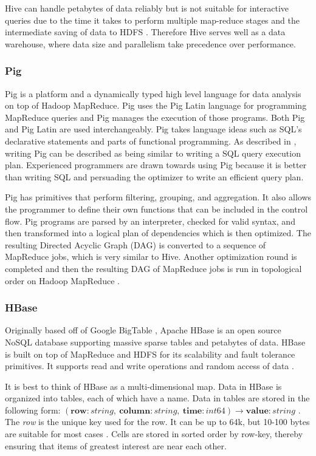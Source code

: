 \documentclass[12pt]{article}
\begin{document}
Hive can handle petabytes of data reliably but is not suitable for interactive queries due to the time it takes to perform multiple map-reduce stages and the intermediate saving of data to HDFS \cite{zhang2016survey}. Therefore Hive serves well as a data warehouse, where data size and parallelism take precedence over performance.


\subsubsection{Pig}

Pig \cite{pig} is a platform and a dynamically typed high level language for data analysis on top of Hadoop MapReduce. Pig uses the Pig Latin \cite{piglatin} language for programming MapReduce queries and Pig manages the execution of those programs. Both Pig and Pig Latin are used interchangeably. Pig takes language ideas such as SQL's declarative statements and parts of functional programming. As described in \cite{sakr2013hadoop}, writing Pig can be described as being similar to writing a SQL query execution plan. Experienced programmers are drawn towards using Pig because it is better than writing SQL and persuading the optimizer to write an efficient query plan.

Pig has primitives that perform filtering, grouping, and aggregation. It also allows the programmer to define their own functions that can be included in the control flow. Pig programs are parsed by an interpreter, checked for valid syntax, and then transformed into a logical plan of dependencies which is then optimized. The resulting Directed Acyclic Graph (DAG) is converted to a sequence of MapReduce jobs, which is very similar to Hive. Another optimization round is completed and then the resulting DAG of MapReduce jobs is run in topological order on Hadoop MapReduce \cite{sakr2013hadoop,polato2014hadoop}.


\subsubsection{HBase}

Originally based off of Google BigTable \cite{chang2008bigtable}, Apache HBase is an open source NoSQL database supporting massive sparse tables and petabytes of data. HBase is built on top of MapReduce and HDFS for its scalability and fault tolerance primitives. It supports read and write operations and random access of data \cite{hbaseanalysis}.

It is best to think of HBase as a multi-dimensional map. Data in HBase is organized into tables, each of which have a name. Data in tables are stored in the following form: $(\mathbf{row}:string, \ \mathbf{column}:string, \ \mathbf{time}:int64) \rightarrow \mathbf{value}:string$ \cite{chang2008bigtable,hbasedocs}. The \textit{row} is the unique key used for the row. It can be up to 64k, but 10-100 bytes are suitable for most cases \cite{chang2008bigtable}. Cells are stored in sorted order by row-key, thereby ensuring that items of greatest interest are near each other.
\end{document}
